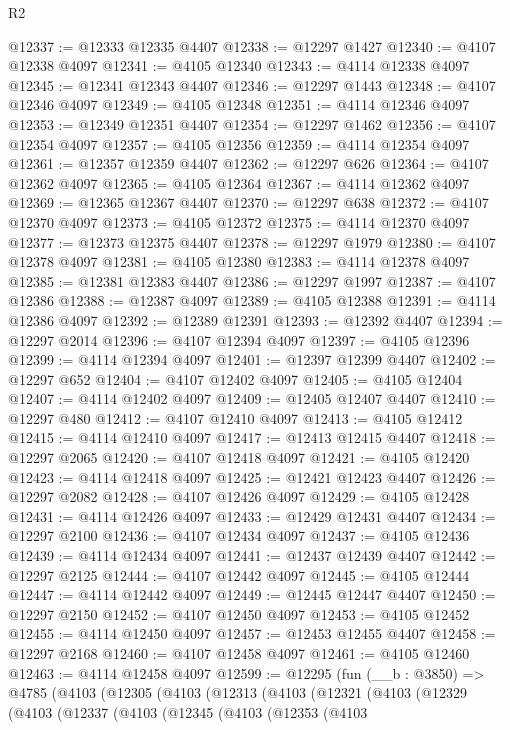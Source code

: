 \begin{lexlean}{R2}
\begin{coremodule}
@12337 := @12333 @12335 @4407
@12338 := @12297 @1427
@12340 := @4107 @12338 @4097
@12341 := @4105 @12340
@12343 := @4114 @12338 @4097
@12345 := @12341 @12343 @4407
@12346 := @12297 @1443
@12348 := @4107 @12346 @4097
@12349 := @4105 @12348
@12351 := @4114 @12346 @4097
@12353 := @12349 @12351 @4407
@12354 := @12297 @1462
@12356 := @4107 @12354 @4097
@12357 := @4105 @12356
@12359 := @4114 @12354 @4097
@12361 := @12357 @12359 @4407
@12362 := @12297 @626
@12364 := @4107 @12362 @4097
@12365 := @4105 @12364
@12367 := @4114 @12362 @4097
@12369 := @12365 @12367 @4407
@12370 := @12297 @638
@12372 := @4107 @12370 @4097
@12373 := @4105 @12372
@12375 := @4114 @12370 @4097
@12377 := @12373 @12375 @4407
@12378 := @12297 @1979
@12380 := @4107 @12378 @4097
@12381 := @4105 @12380
@12383 := @4114 @12378 @4097
@12385 := @12381 @12383 @4407
@12386 := @12297 @1997
@12387 := @4107 @12386
@12388 := @12387 @4097
@12389 := @4105 @12388
@12391 := @4114 @12386 @4097
@12392 := @12389 @12391
@12393 := @12392 @4407
@12394 := @12297 @2014
@12396 := @4107 @12394 @4097
@12397 := @4105 @12396
@12399 := @4114 @12394 @4097
@12401 := @12397 @12399 @4407
@12402 := @12297 @652
@12404 := @4107 @12402 @4097
@12405 := @4105 @12404
@12407 := @4114 @12402 @4097
@12409 := @12405 @12407 @4407
@12410 := @12297 @480
@12412 := @4107 @12410 @4097
@12413 := @4105 @12412
@12415 := @4114 @12410 @4097
@12417 := @12413 @12415 @4407
@12418 := @12297 @2065
@12420 := @4107 @12418 @4097
@12421 := @4105 @12420
@12423 := @4114 @12418 @4097
@12425 := @12421 @12423 @4407
@12426 := @12297 @2082
@12428 := @4107 @12426 @4097
@12429 := @4105 @12428
@12431 := @4114 @12426 @4097
@12433 := @12429 @12431 @4407
@12434 := @12297 @2100
@12436 := @4107 @12434 @4097
@12437 := @4105 @12436
@12439 := @4114 @12434 @4097
@12441 := @12437 @12439 @4407
@12442 := @12297 @2125
@12444 := @4107 @12442 @4097
@12445 := @4105 @12444
@12447 := @4114 @12442 @4097
@12449 := @12445 @12447 @4407
@12450 := @12297 @2150
@12452 := @4107 @12450 @4097
@12453 := @4105 @12452
@12455 := @4114 @12450 @4097
@12457 := @12453 @12455 @4407
@12458 := @12297 @2168
@12460 := @4107 @12458 @4097
@12461 := @4105 @12460
@12463 := @4114 @12458 @4097
@12599 := @12295
    (fun (__b : @3850) =>
    @4785
      (@4103
        (@12305
          (@4103
            (@12313
              (@4103
                (@12321
                  (@4103
                    (@12329
                      (@4103
                        (@12337
                          (@4103
                            (@12345
                              (@4103
                                (@12353
                                  (@4103

\end{coremodule}
\end{lexlean}
